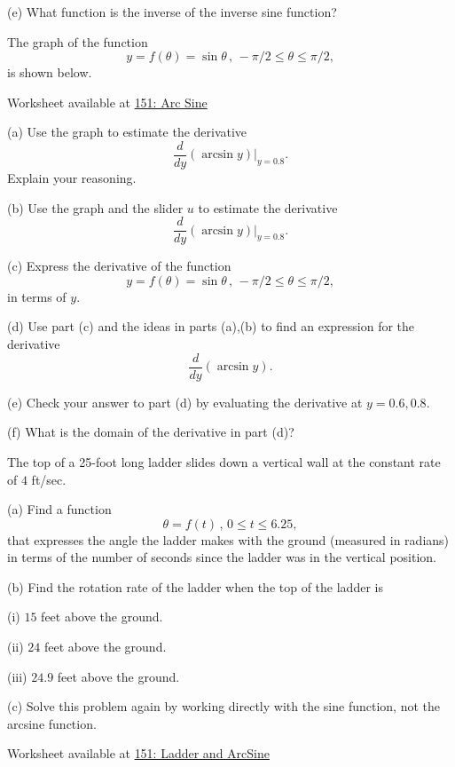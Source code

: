\documentclass{ximera}
\begin{document}
(e) What function is the inverse of the inverse sine function?

\begin{question}   \label{Q:34fgt44}
The graph of the function
\[
 y  = f(\theta) = \sin \theta \, , \, -\pi/2 \leq \theta \leq \pi/2 ,
\]
is shown below.

\begin{onlineOnly}
    \begin{center}
\end{center}
\end{onlineOnly}

Worksheet available at \href{https://www.desmos.com/calculator/lxwoeir1pt}{151: Arc Sine}


(a) Use the graph to estimate the derivative 
\[
      \frac{d}{dy} \left(   \arcsin y  \right)\Big|_{y=0.8} .
\]
Explain your reasoning.

(b) Use the graph and the slider $u$ to estimate the derivative
\[
      \frac{d}{dy} \left(   \arcsin y  \right)\Big|_{y=0.8} .
\]

(c) Express the derivative of the function 
\[
 y  = f(\theta) = \sin \theta \, , \, -\pi/2 \leq \theta \leq \pi/2 ,
\]
in terms of $y$.

(d) Use part (c) and the ideas in parts (a),(b) to find an expression for the derivative
\[
   \frac{d}{dy} \left(   \arcsin y  \right) .
\]

(e) Check your answer to part (d) by evaluating the derivative at $y=0.6, 0.8$.

(f) What is the domain of the derivative in part (d)?
\end{question}


\begin{question}  \label{Q:dfbhhyh5g5tr231}

The top of a 25-foot long ladder slides down a vertical wall at the constant rate of $4$ ft/sec. 

(a) Find a function 
\[
       \theta = f(t) \, , \, 0\leq t \leq 6.25 ,
\]
that expresses the angle the ladder makes with the ground (measured in radians) in terms of the number of seconds since the ladder was in the vertical position.

(b) Find the rotation rate of the ladder when the top of the ladder is 

     (i) $15$ feet above the ground. 

     (ii) $24$ feet above the ground.

     (iii) $24.9$ feet above the ground.


(c) Solve this problem again by working directly with the sine function, not the arcsine function.

 


\begin{onlineOnly}
    \begin{center}
\end{center}
\end{onlineOnly}

Worksheet available at \href{https://www.desmos.com/calculator/5c4lssovbi}{151: Ladder and ArcSine}

\end{question}
\end{document}
